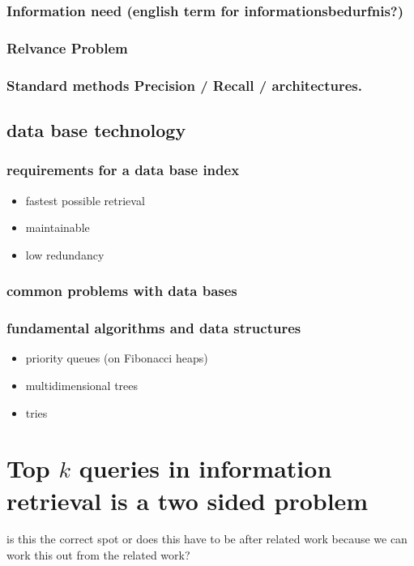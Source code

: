 \documentclass[•]{article}
\begin{document}
\subsubsection{Information need (english term for informationsbedurfnis?)}
\subsubsection{Relvance Problem}
\subsubsection{Standard methods Precision / Recall / architectures.}
\subsection{data base technology}
\subsubsection{requirements for a data base index}
\begin{itemize}
\item fastest possible retrieval
\item maintainable
\item low redundancy
\end{itemize}
\subsubsection{common problems with data bases}
\subsubsection{fundamental algorithms and data structures}
\begin{itemize}
\item priority queues (on Fibonacci heaps)
\item multidimensional trees
\item tries
\end{itemize}


\pagebreak
\section{Top $k$ queries in information retrieval is a two sided problem}
is this the correct spot or does this have to be after related work because we can work this out from the related work?
\end{document}
